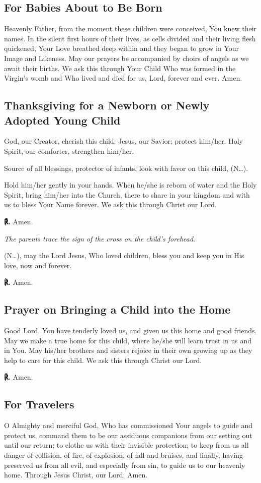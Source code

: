 \documentclass[12pt]{article}
\makeatletter
\newcommand{\prayertitle}[1]{\subsection{#1}}
\newcommand{\insertname}{(N\dots)\xspace}
\newcommand{\emphasis}[1]{\emph{#1}}
\newcommand{\emphasis}[1]{\textsl{#1}}
\newcommand{\instruction}[1]{\emphasis{#1}}
\newcommand{\response}{{\setmainfont{Times New Roman}\textbf{℟.}}\xspace}
\DeclareRobustCommand{\response}{\textbf{\vers@resp{0pt}{R}.}\xspace}
\newcommand{\vers@resp@sym}{\raisebox{0.2ex}{\rotatebox[origin=c]{-20}{$\m@th\rceil$}}}
\newcommand{\vers@resp}[2]{%
		{\ooalign{\hidewidth\kern#1\vers@resp@sym\hidewidth\cr#2\cr}}%
	}
\makeatother
\begin{document}
\prayertitle{For Babies About to Be Born}
\label{prayer:babies_about_to_be_born}
Heavenly Father, from the moment these children were conceived, You knew their names.
In the silent first hours of their lives, as cells divided and their living flesh quickened, Your Love breathed deep within and they began to grow in Your Image and Likeness.
May our prayers be accompanied by choirs of angels as we await their births.
We ask this through Your Child Who was formed in the Virgin's womb and Who lived and died for us, Lord, forever and ever. Amen.

\prayertitle{Thanksgiving for a Newborn or Newly Adopted Young Child}
\label{prayer:thanksgiving_newborn}
God, our Creator, cherish this child.
Jesus, our Savior; protect him/her.
Holy Spirit, our comforter, strengthen him/her.

Source of all blessings, protector of infants, look with favor on this child, \insertname.

Hold him/her gently in your hands.
When he/she is reborn of water and the Holy Spirit, bring him/her into the Church, there to share in your kingdom and with us to bless Your Name forever.
We ask this through Christ our Lord.

\response Amen.

\instruction{The parents trace the sign of the cross on the child's forehead.}

\insertname, may the Lord Jesus, Who loved children, bless you and keep you in His love, now and forever.

\response Amen.

\prayertitle{Prayer on Bringing a Child into the Home}
\label{prayer:bringing_child_into_home}
Good Lord, You have tenderly loved us, and given us this home and good friends.
May we make a true home for this child, where he/she will learn trust in us and in You.
May his/her brothers and sisters rejoice in their own growing up as they help to care for this child.
We ask this through Christ our Lord.

\response Amen.

\prayertitle{For Travelers}
\label{prayer:travelers}
O Almighty and merciful God, Who has commissioned Your angels to guide and protect us, command them to be our assiduous companions from our setting out until our return;
to clothe us with their invisible protection;
to keep from us all danger of collision, of fire, of explosion, of fall and bruises, and finally, having preserved us from all evil, and especially from sin, to guide us to our heavenly home.
Through Jesus Christ, our Lord. Amen.
\end{document}
